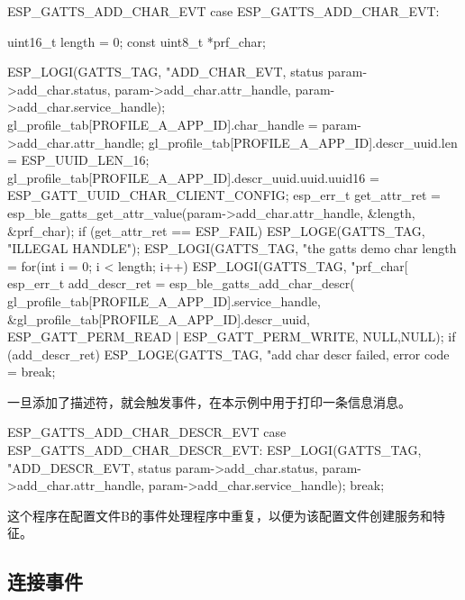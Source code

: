 \documentclass[lang=cn,newtx,10pt,scheme=chinese]{elegantbook}
\begin{document}
\begin{mycode}{ESP\_GATTS\_ADD\_CHAR\_EVT}
    case ESP_GATTS_ADD_CHAR_EVT: {
         uint16_t length = 0;
         const uint8_t *prf_char;

         ESP_LOGI(GATTS_TAG, "ADD_CHAR_EVT, status %
                 param->add_char.status, param->add_char.attr_handle, param->add_char.service_handle);  
                 gl_profile_tab[PROFILE_A_APP_ID].char_handle = param->add_char.attr_handle;
                 gl_profile_tab[PROFILE_A_APP_ID].descr_uuid.len = ESP_UUID_LEN_16;  
                 gl_profile_tab[PROFILE_A_APP_ID].descr_uuid.uuid.uuid16 = ESP_GATT_UUID_CHAR_CLIENT_CONFIG;  
                 esp_err_t get_attr_ret = esp_ble_gatts_get_attr_value(param->add_char.attr_handle, &length, &prf_char);         
         if (get_attr_ret == ESP_FAIL){  
	           ESP_LOGE(GATTS_TAG, "ILLEGAL HANDLE");
         }
         ESP_LOGI(GATTS_TAG, "the gatts demo char length = %
         for(int i = 0; i < length; i++){
             ESP_LOGI(GATTS_TAG, "prf_char[%
         }       
         esp_err_t add_descr_ret = esp_ble_gatts_add_char_descr(  
                                 gl_profile_tab[PROFILE_A_APP_ID].service_handle,  
                                 &gl_profile_tab[PROFILE_A_APP_ID].descr_uuid,  
                                 ESP_GATT_PERM_READ | ESP_GATT_PERM_WRITE,  
                                 NULL,NULL);
         if (add_descr_ret){
            ESP_LOGE(GATTS_TAG, "add char descr failed, error code = %
         }
         break;
    }
\end{mycode}

一旦添加了描述符，就会触发事件，在本示例中用于打印一条信息消息。

\begin{mycode}{ESP\_GATTS\_ADD\_CHAR\_DESCR\_EVT}
    case ESP_GATTS_ADD_CHAR_DESCR_EVT:
         ESP_LOGI(GATTS_TAG, "ADD_DESCR_EVT, status %
                  param->add_char.status, param->add_char.attr_handle,  
                  param->add_char.service_handle);
         break;
\end{mycode}

这个程序在配置文件B的事件处理程序中重复，以便为该配置文件创建服务和特征。

\subsection{连接事件}
\end{document}
